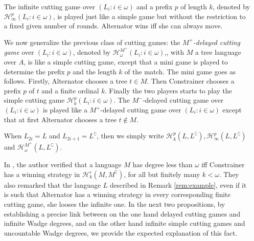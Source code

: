 The infinite cutting game over $( L_i : i \in \omega )$ and a prefix $p$ of length $k$, denoted by $\mathcal{H}^p_\infty(L_i : i \in \omega )$, is played just like a simple game but without the restriction to a fixed given number of rounds. Alternator wins iff she can always move.

We now generalize the previous class of cutting games: the \emph{$M^+$-delayed cutting game} over $( L_i : i \in \omega )$, denoted by $\mathcal{H}^{M^+}_\omega(L_i : i \in \omega )$,, with $M$ a tree language over $A$, is like a simple cutting game, except that a mini game is played to determine the prefix $p$ and the length $k$ of the match. 
The mini game goes as follows. Firstly, Alternator chooses a tree $t \in M$. Then Constrainer chooses a prefix $p$ of $t$ and a finite ordinal $k$. Finally the two players starts to play the simple cutting game $\mathcal{H}^p_k(L_i : i \in \omega )$. 
The $M^-$-delayed cutting game over $( L_i : i \in \omega )$ is played like a $M^+$-delayed cutting game over $( L_i : i \in \omega )$ except that at first Alternator chooses a tree $t \notin M$.

When $L_{2i}=L$ and $L_{2i +1}=L^\complement$, then we simply write $\mathcal{H}^p_k(L, L^\complement), \mathcal{H}^p_\infty(L, L^\complement)$ and  $\mathcal{H}^{M^+}_\omega(L, L^\complement)$.

In \cite{bp}, the author verified that a language $M$ has degree less than $\omega$ iff  Constrainer has a winning strategy in $\mathcal{H}^\varepsilon_k(M, M^\complement)$, for all but finitely many $k< \omega$.
They also remarked that the language $L$ described in Remark \ref{rem:example}, even  if it is such that Alternator has a winning strategy in every corresponding finite cutting game, she looses the infinite one.
In the next two propositions, by establishing a precise link between on the one hand delayed cutting games and infinite Wadge degrees, and on the other hand infinite simple cutting games and uncountable Wadge degrees, we provide the expected explanation of this fact.


